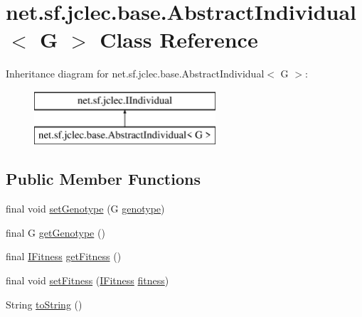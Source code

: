 \hypertarget{classnet_1_1sf_1_1jclec_1_1base_1_1_abstract_individual_3_01_g_01_4}{\section{net.\-sf.\-jclec.\-base.\-Abstract\-Individual$<$ G $>$ Class Reference}
\label{classnet_1_1sf_1_1jclec_1_1base_1_1_abstract_individual_3_01_g_01_4}
}
Inheritance diagram for net.\-sf.\-jclec.\-base.\-Abstract\-Individual$<$ G $>$\-:\begin{figure}[H]
\begin{center}
\leavevmode
\includegraphics[height=2.000000cm]{classnet_1_1sf_1_1jclec_1_1base_1_1_abstract_individual_3_01_g_01_4}
\end{center}
\end{figure}
\subsection*{Public Member Functions}
\begin{DoxyCompactItemize}
\item 
final void \hyperlink{classnet_1_1sf_1_1jclec_1_1base_1_1_abstract_individual_3_01_g_01_4_a335c562b813e8b67ce18bd4d8da703ae}{set\-Genotype} (G \hyperlink{classnet_1_1sf_1_1jclec_1_1base_1_1_abstract_individual_3_01_g_01_4_a17532a6cefcacd7a913749d1f46d798c}{genotype})
\item 
final G \hyperlink{classnet_1_1sf_1_1jclec_1_1base_1_1_abstract_individual_3_01_g_01_4_aab0ec4944079f7b52dc834f8ed79024e}{get\-Genotype} ()
\item 
final \hyperlink{interfacenet_1_1sf_1_1jclec_1_1_i_fitness}{I\-Fitness} \hyperlink{classnet_1_1sf_1_1jclec_1_1base_1_1_abstract_individual_3_01_g_01_4_a0c7384db3b17214bff18ffcbbb21fda0}{get\-Fitness} ()
\item 
final void \hyperlink{classnet_1_1sf_1_1jclec_1_1base_1_1_abstract_individual_3_01_g_01_4_a99712eb48238ca6e13411cf2e68dc26b}{set\-Fitness} (\hyperlink{interfacenet_1_1sf_1_1jclec_1_1_i_fitness}{I\-Fitness} \hyperlink{classnet_1_1sf_1_1jclec_1_1base_1_1_abstract_individual_3_01_g_01_4_a333045009734aca2834c6a7fab508fa2}{fitness})
\item 
String \hyperlink{classnet_1_1sf_1_1jclec_1_1base_1_1_abstract_individual_3_01_g_01_4_a945e26198c23a9ffe41a46aa78a7d141}{to\-String} ()
\end{DoxyCompactItemize}
